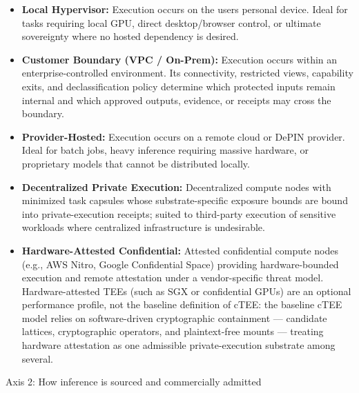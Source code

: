 \documentclass[
  11pt,
]{article}
\providecommand{\tightlist}{%
  \setlength{\itemsep}{0pt}\setlength{\parskip}{0pt}}
\begin{document}
\begin{itemize}
\tightlist
\item
  \textbf{Local Hypervisor:} Execution occurs on the
  user\textquotesingle s personal device. Ideal for tasks requiring
  local GPU, direct desktop/browser control, or ultimate sovereignty
  where no hosted dependency is desired.
\item
  \textbf{Customer Boundary (VPC / On-Prem):} Execution occurs within an
  enterprise-controlled environment. Its connectivity, restricted views,
  capability exits, and declassification policy determine which protected
  inputs remain internal and which approved outputs, evidence, or receipts may
  cross the boundary.
\item
  \textbf{Provider-Hosted:} Execution occurs on a remote cloud or DePIN
  provider. Ideal for batch jobs, heavy inference requiring massive
  hardware, or proprietary models that cannot be distributed locally.
\item
  \textbf{Decentralized Private Execution:} Decentralized compute nodes
  with minimized task capsules whose substrate-specific exposure bounds
  are bound into private-execution receipts; suited to third-party
  execution of sensitive workloads where centralized infrastructure is
  undesirable.
\item
  \textbf{Hardware-Attested Confidential:} Attested confidential compute
  nodes (e.g., AWS Nitro, Google Confidential Space) providing
  hardware-bounded execution and remote attestation under a
  vendor-specific threat model. Hardware-attested TEEs (such as SGX or
  confidential GPUs) are an optional performance profile, not the
  baseline definition of cTEE: the baseline cTEE model relies on
  software-driven cryptographic containment --- candidate lattices,
  cryptographic operators, and plaintext-free mounts --- treating
  hardware attestation as one admissible private-execution substrate among
  several.
\end{itemize}

Axis 2: How inference is sourced and commercially admitted
\end{document}
